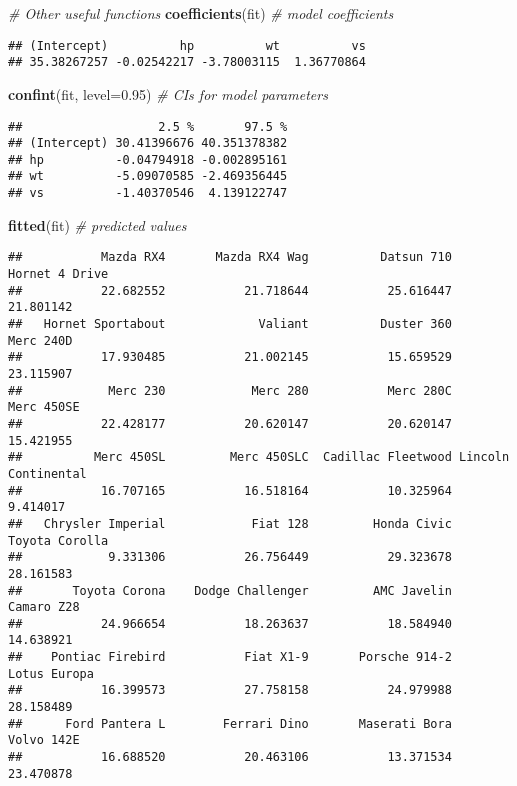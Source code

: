 \documentclass[]{article}
\newenvironment{Shaded}{\begin{snugshade}}{\end{snugshade}}
\newcommand{\CommentTok}[1]{\textcolor[rgb]{0.56,0.35,0.01}{\textit{#1}}}
\newcommand{\DataTypeTok}[1]{\textcolor[rgb]{0.13,0.29,0.53}{#1}}
\newcommand{\FloatTok}[1]{\textcolor[rgb]{0.00,0.00,0.81}{#1}}
\newcommand{\KeywordTok}[1]{\textcolor[rgb]{0.13,0.29,0.53}{\textbf{#1}}}
\newcommand{\NormalTok}[1]{#1}
\begin{document}
\begin{Shaded}
\begin{Highlighting}[]
\CommentTok{# Other useful functions }
\KeywordTok{coefficients}\NormalTok{(fit) }\CommentTok{# model coefficients}
\end{Highlighting}
\end{Shaded}

\begin{verbatim}
## (Intercept)          hp          wt          vs 
## 35.38267257 -0.02542217 -3.78003115  1.36770864
\end{verbatim}

\begin{Shaded}
\begin{Highlighting}[]
\KeywordTok{confint}\NormalTok{(fit, }\DataTypeTok{level=}\FloatTok{0.95}\NormalTok{) }\CommentTok{# CIs for model parameters }
\end{Highlighting}
\end{Shaded}

\begin{verbatim}
##                   2.5 %       97.5 %
## (Intercept) 30.41396676 40.351378382
## hp          -0.04794918 -0.002895161
## wt          -5.09070585 -2.469356445
## vs          -1.40370546  4.139122747
\end{verbatim}

\begin{Shaded}
\begin{Highlighting}[]
\KeywordTok{fitted}\NormalTok{(fit) }\CommentTok{# predicted values}
\end{Highlighting}
\end{Shaded}

\begin{verbatim}
##           Mazda RX4       Mazda RX4 Wag          Datsun 710      Hornet 4 Drive 
##           22.682552           21.718644           25.616447           21.801142 
##   Hornet Sportabout             Valiant          Duster 360           Merc 240D 
##           17.930485           21.002145           15.659529           23.115907 
##            Merc 230            Merc 280           Merc 280C          Merc 450SE 
##           22.428177           20.620147           20.620147           15.421955 
##          Merc 450SL         Merc 450SLC  Cadillac Fleetwood Lincoln Continental 
##           16.707165           16.518164           10.325964            9.414017 
##   Chrysler Imperial            Fiat 128         Honda Civic      Toyota Corolla 
##            9.331306           26.756449           29.323678           28.161583 
##       Toyota Corona    Dodge Challenger         AMC Javelin          Camaro Z28 
##           24.966654           18.263637           18.584940           14.638921 
##    Pontiac Firebird           Fiat X1-9       Porsche 914-2        Lotus Europa 
##           16.399573           27.758158           24.979988           28.158489 
##      Ford Pantera L        Ferrari Dino       Maserati Bora          Volvo 142E 
##           16.688520           20.463106           13.371534           23.470878
\end{verbatim}
\end{document}
